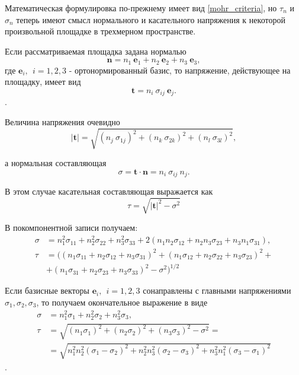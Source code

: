 Математическая формулировка по-прежнему имеет вид \eqref{mohr_criteria}, но $\tau_n$ и $\sigma_n$ теперь имеют смысл нормального и касательного напряжения к некоторой произвольной площадке в трехмерном пространстве.

Если рассматриваемая площадка задана нормалью
\begin{equation}
\mathbf{n} = n_1~\mathbf{e}_1 + n_2~\mathbf{e}_2 + n_3~\mathbf{e}_3,
\end{equation}
где $\mathbf{e}_i,~~ i=1,2,3$ - ортонормированный базис, то напряжение, действующее на площадку, имеет вид
\begin{equation}
\mathbf{t} = n_i~\sigma_{ij}~\mathbf{e}_j.
\end{equation}.

Величина напряжения очевидно
\begin{equation}
|\mathbf{t}| = \sqrt{ (n_j~\sigma_{1j})^2 + (n_k~\sigma_{2k})^2 + (n_l~\sigma_{3l})^2},
\end{equation}

а нормальная составляющая
\begin{equation}
\sigma = \mathbf{t}\cdot\mathbf{n} = n_i~\sigma_{ij}~n_j.
\end{equation}

В этом случае касательная составляющая выражается как
\begin{equation}
\tau = \sqrt{|\mathbf{t}|^2 - \sigma^2}
\end{equation}

В покомпонентной записи получаем:
\begin{align}
\sigma &= n_1^2 \sigma_{11} + n_2^2 \sigma_{22} + n_3^2 \sigma_{33} + 
	2(n_1 n_2 \sigma_{12} + n_2 n_3 \sigma_{23} + n_3 n_1 \sigma_{31}), \nonumber\\
\tau &= ((n_1\sigma_{11} + n_2\sigma_{12} + n_3\sigma_{31})^2 +
	(n_1\sigma_{12} + n_2\sigma_{22} + n_3\sigma_{23})^2 + \nonumber\\
 &	+ (n_1\sigma_{31} + n_2\sigma_{23} + n_3\sigma_{33})^2 - \sigma^2)^{1/2}
\end{align}

Если базисные векторы $\mathbf{e}_i,~~ i=1,2,3$ сонаправлены с главными напряжениями $\sigma_1, \sigma_2, \sigma_3$, то получаем окончательное выражение в виде
\begin{align}
    \sigma &= n_1^2 \sigma_{1} + n_2^2 \sigma_{2} + n_3^2 \sigma_{3}, \nonumber\\
    \tau &= \sqrt{(n_1\sigma_{1})^2 + (n_2\sigma_{2})^2 + (n_3\sigma_{3})^2 - \sigma^2} = \nonumber\\
         &= \sqrt{n_1^2 n_2^2 (\sigma_1-\sigma_2)^2 + n_2^2 n_3^2 (\sigma_2-\sigma_3)^2 + 
                 n_3^2 n_1^2 (\sigma_3 - \sigma_1)^2}
\end{align}.


